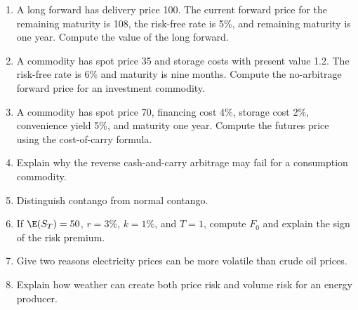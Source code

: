 \begin{enumerate}
    \item A long forward has delivery price 100. The current forward price for
    the remaining maturity is 108, the risk-free rate is 5\%, and remaining
    maturity is one year. Compute the value of the long forward.
    \item A commodity has spot price 35 and storage costs with present value 1.2.
    The risk-free rate is 6\% and maturity is nine months. Compute the
    no-arbitrage forward price for an investment commodity.
    \item A commodity has spot price 70, financing cost 4\%, storage cost 2\%,
    convenience yield 5\%, and maturity one year. Compute the futures price
    using the cost-of-carry formula.
    \item Explain why the reverse cash-and-carry arbitrage may fail for a
    consumption commodity.
    \item Distinguish contango from normal contango.
    \item If $\E(S_T)=50$, $r=3\%$, $k=1\%$, and $T=1$, compute $F_0$ and
    explain the sign of the risk premium.
    \item Give two reasons electricity prices can be more volatile than crude
    oil prices.
    \item Explain how weather can create both price risk and volume risk for an
    energy producer.
\end{enumerate}


